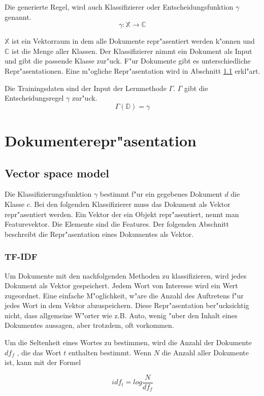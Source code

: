 \documentclass[12pt,a4paper,twoside]{article}
\begin{document}
Die generierte Regel, wird auch Klassifizierer oder Entscheidungsfunktion $\gamma$ genannt.
\[
\gamma : \mathbb{X} \to \mathbb{C}
\]

$\mathbb{X}$ ist ein Vektorraum in dem alle Dokumente repr"asentiert werden k"onnen und $\mathbb{C}$ ist die Menge aller Klassen. Der Klassifizierer nimmt ein Dokument als Input und gibt die passende Klasse zur"uck. F"ur Dokumente gibt es unterschiedliche Repr"asentationen. Eine m"ogliche Repr"asentation wird in Abschnitt \ref{sec:vectorspacemodel} erkl"art.

Die Trainingsdaten sind der Input der Lernmethode $\Gamma$. $\Gamma$ gibt die Entscheidungsregel $\gamma$ zur"uck.
\[
\Gamma(\mathbb{D}) = \gamma
\]

\section{Dokumenterepr"asentation}
\label{sec:linearclassifiers}

\subsection{Vector space model}
\label{sec:vectorspacemodel}
Die Klassifizierungsfunktion $\gamma$ bestimmt f"ur ein gegebenes Dokument $d$ die Klasse $c$. Bei den folgenden Klassifizierer muss das Dokument als Vektor re\-pr"as\-entiert werden. Ein Vektor der ein Objekt repr"asentiert, nennt man Featurevektor. Die Elemente sind die Features. Der folgenden Abschnitt beschreibt die Repr"asentation eines Dokumentes als Vektor.

\subsubsection{TF-IDF}
\label{sec:tfidf}

Um Dokumente mit den nachfolgenden Methoden zu klassifizieren, wird jedes Dokument als Vektor gespeichert. Jedem Wort von Interesse wird ein Wert zugeordnet. Eine einfache M"oglichkeit, w"are die Anzahl des Auftretens f"ur jedes Wort in dem Vektor abzuspeichern. Diese Repr"asentation ber"ucksichtig nicht, dass allgemeine W"orter wie z.B. Auto, wenig "uber den Inhalt eines Dokumentes aussagen, aber trotzdem, oft vorkommen.

Um die Seltenheit eines Wortes zu bestimmen, wird die Anzahl der Dokumente $df_f$ , die das Wort $t$ enthalten bestimmt. Wenn $N$ die Anzahl aller Dokumente ist, kann mit der Formel

\[
idf_t = log \frac{ N}{df_f}
\]
\end{document}
